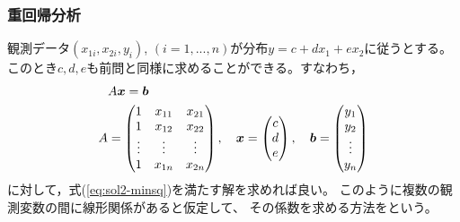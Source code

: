 \documentclass[twocolumn,11pt]{jarticle}
\begin{document}

\subsubsection{重回帰分析\label{sec:multi-regression}\prog}
観測データ$(x_{1i},x_{2i},y_i)$, $(i=1,...,n)$が分布$y=c+dx_1+ex_2$に従うとする。
このとき$c,d,e$も前問と同様に求めることができる。すなわち，
\begin{align}
  &A\boldsymbol{x}=\boldsymbol{b}\notag\\
  A&=\begin{pmatrix}
    1 & x_{11} & x_{21}\\
    1 & x_{12} & x_{22}\\
    \vdots & \vdots & \vdots \\
    1 & x_{1n} & x_{2n}
  \end{pmatrix},\quad
  \boldsymbol{x}=
  \begin{pmatrix}
    c \\ d \\e
  \end{pmatrix},\quad
  \boldsymbol{b}=
  \begin{pmatrix}
    y_1 \\ y_2 \\\vdots \\ y_n
  \end{pmatrix}\notag
\end{align}
に対して，式(\ref{eq:sol2-minsq})を満たす解を求めれば良い。
このように複数の観測変数の間に線形関係があると仮定して、
その係数を求める方法をという。
\end{document}

